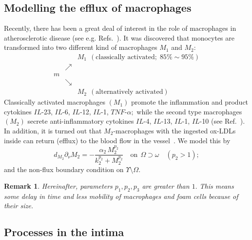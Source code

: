 \documentclass[reqno]{amsart}            %
\newtheorem{remark}{Remark}[section]
\numberwithin{equation}{section}
\begin{document}
\subsection{Modelling the efflux of macrophages}\label{st-1+}
Recently, there has been a great deal of interest in the role of macrophages in atherosclerotic disease (see e.g. Refs.~\cite{JohnNewby,ManGarLoc,Paulson-others,ManDiv-11,GuiShiSunAkaMur-12,Feig-others}). It was discovered that monocytes are transformed into two different kind of macrophages $M_1$ and $M_2:$
\begin{equation}\label{diagram}
\begin{array}{rcl}
& & M_1 \ \ (\text{classically activated;} \ \ 85\% \sim 95\%)
\\
 & \nearrow &
\\
m &  &
\\
& \searrow &
\\
& & M_2 \ \ (\text{alternatively activated})
\end{array}
\end{equation}
Classically activated macrophages $(M_1)$ promote the inflammation
and product cytokines $IL$-23, $IL$-6, $IL$-12, $IL$-1, $TNF$-$\alpha;$
while the second type macrophages $(M_2)$ secrete anti-inflammatory cytokines $IL$-4, $IL$-13, $IL$-1, $IL$-10 (see Ref.~\cite{GuiShiSunAkaMur-12}).
In addition, it is turned out that $M_2$-macrophages with the ingested ox-LDLs inside can return (efflux) to the blood flow in the vessel~\cite{Feig-others}. We model this by
\begin{equation}\label{bc-3}
d_{M_2} \partial_{\nu} M_2 = - \frac{\alpha_2 \, M_2^{p_2}}{k^{p_2}_2 + M_2^{p_2}}  \quad \text{on} \ \ \Omega \supset \omega \quad (p_2 > 1);
\end{equation}
and the non-flux boundary condition on $\Upsilon\setminus \Omega.$

\begin{remark}
 Hereinafter,  parameters $p_1, p_2, p_3$ are greater than $1.$  This means some delay in time and less mobility
of macrophages and foam cells because of their size.
\end{remark}


\subsection{Processes in the intima}
\end{document}
